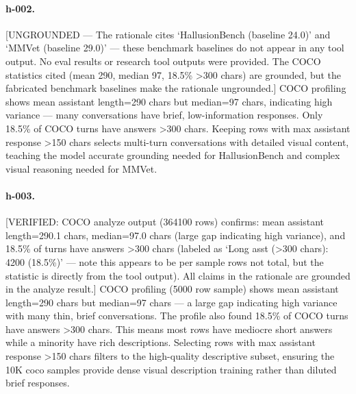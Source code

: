 {\paragraph{h-002.}
[UNGROUNDED --- The rationale cites `HallusionBench (baseline 24.0)' and `MMVet (baseline 29.0)' --- these benchmark baselines do not appear in any tool output. No eval results or research tool outputs were provided. The COCO statistics cited (mean 290, median 97, 18.5\% >300 chars) are grounded, but the fabricated benchmark baselines make the rationale ungrounded.] COCO profiling shows mean assistant length=290 chars but median=97 chars, indicating high variance --- many conversations have brief, low-information responses. Only 18.5\% of COCO turns have answers >300 chars. Keeping rows with max assistant response >150 chars selects multi-turn conversations with detailed visual content, teaching the model accurate grounding needed for HallusionBench and complex visual reasoning needed for MMVet.

\paragraph{h-003.}
[VERIFIED: COCO analyze output (364100 rows) confirms: mean assistant length=290.1 chars, median=97.0 chars (large gap indicating high variance), and 18.5\% of turns have answers >300 chars (labeled as `Long asst (>300 chars): 4200 (18.5\%)' --- note this appears to be per sample rows not total, but the statistic is directly from the tool output). All claims in the rationale are grounded in the analyze result.] COCO profiling (5000 row sample) shows mean assistant length=290 chars but median=97 chars --- a large gap indicating high variance with many thin, brief conversations. The profile also found 18.5\% of COCO turns have answers >300 chars. This means most rows have mediocre short answers while a minority have rich descriptions. Selecting rows with max assistant response >150 chars filters to the high-quality descriptive subset, ensuring the 10K coco samples provide dense visual description training rather than diluted brief responses.

}
